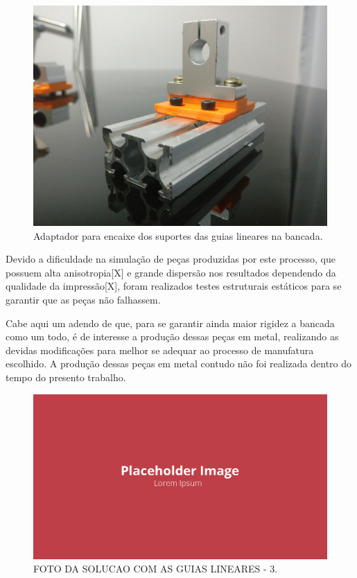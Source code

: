\begin{figure}[!ht]
    \centering
    \includegraphics[width=.8\linewidth]{figuras/construcao/encaixe_sk12.jpg}
    \caption{Adaptador para encaixe dos suportes das guias lineares na bancada\cite{autor}.}
    \label{fig:adaptador_sk12}
\end{figure}

Devido a dificuldade na simulação de peças produzidas por este processo, que possuem alta anisotropia[X] e grande dispersão nos resultados dependendo da qualidade da impressão[X], foram realizados testes estruturais estáticos para se garantir que as peças não falhassem. 

Cabe aqui um adendo de que, para se garantir ainda maior rigidez a bancada como um todo, é de interesse a produção dessas peças em metal, realizando as devidas modificações para melhor se adequar ao processo de manufatura escolhido. A produção dessas peças em metal contudo não foi realizada dentro do tempo do presento trabalho.

\begin{figure}[!ht]
    \centering
    \includegraphics[width=.8\linewidth]{figuras/outras/placeholder.png}
    \caption{FOTO DA SOLUCAO COM AS GUIAS LINEARES - 3\cite{autor}.}
    \label{fig:placeholder}
\end{figure}

